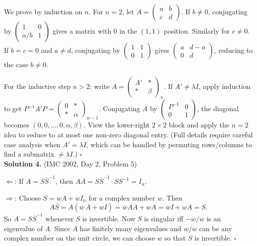 \documentclass{article}
\begin{document}
We prove by induction on \( n \). For \( n = 2 \), let \( A = \begin{pmatrix} a & b \\ c & d \end{pmatrix} \). If \( b \neq 0 \), conjugating by \( \begin{pmatrix} 1 & 0 \\ a/b & 1 \end{pmatrix} \) gives a matrix with 0 in the \((1,1)\) position. Similarly for \( c \neq 0 \). If \( b = c = 0 \) and \( a \neq d \), conjugating by \( \begin{pmatrix} 1 & 1 \\ 0 & 1 \end{pmatrix} \) gives \( \begin{pmatrix} a & d-a \\ 0 & d \end{pmatrix} \), reducing to the case \( b \neq 0 \).

For the inductive step \( n > 2 \): write \( A = \begin{pmatrix} A' & * \\ * & \beta \end{pmatrix}_n \). If \( A' \neq \lambda I \), apply induction to get \( P^{-1}A'P = \begin{pmatrix} 0 & * \\ * & \alpha \end{pmatrix}_{n-1} \). Conjugating \( A \) by \( \begin{pmatrix} P^{-1} & 0 \\ 0 & 1 \end{pmatrix} \), the diagonal becomes \( (0, 0, \ldots, 0, \alpha, \beta) \). View the lower-right \( 2 \times 2 \) block and apply the \( n = 2 \) idea to reduce to at most one non-zero diagonal entry. (Full details require careful case analysis when \( A' = \lambda I \), which can be handled by permuting rows/columns to find a submatrix \( \neq \lambda I \).) \hfill\(\square\)
\\

\textbf{Solution 4.} (IMC 2002, Day 2, Problem 5)

\( \Leftarrow \): If \( A = S\overline{S}^{-1} \), then \( A\overline{A} = S\overline{S}^{-1} \cdot \overline{S} S^{-1} = I_n \). \checkmark

\( \Rightarrow \): Choose \( S = wA + \overline{w}I_n \) for a complex number \( w \). Then
\[
A\overline{S} = A(\overline{w}\,\overline{A} + wI) = \overline{w}A\overline{A} + wA = \overline{w}I + wA = S.
\]
So \( A = S\overline{S}^{-1} \) whenever \( S \) is invertible. Now \( S \) is singular iff \( -\overline{w}/w \) is an eigenvalue of \( A \). Since \( A \) has finitely many eigenvalues and \( \overline{w}/w \) can be any complex number on the unit circle, we can choose \( w \) so that \( S \) is invertible. \hfill\(\square\)
\\
\end{document}
